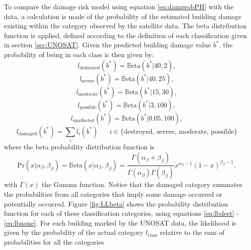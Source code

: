 \documentclass[10pt,a4paper]{article}
\begin{document}
\begin{multicols}{1}
To compare the damage risk model using equation \ref{eq:damprobPH} with the data, a calculation is made of the probability of the estimated building damage existing within the category observed by the satellite data. The beta distribution function is applied, defined according to the definition of each classification given in section \ref{sec:UNOSAT}. Given the predicted building damage value $b^*$, the probability of being in each class is then given by:
\begin{equation}\label{eq:lbdest}
  l_{\text{destroyed}}(b^*)=\mathbb{B}\text{eta}(b^*|40,2),
\end{equation}
\begin{equation}\label{eq:lbmaj}
  l_{\text{severe}}(b^*)=\mathbb{B}\text{eta}(b^*|40,25),
\end{equation}
\begin{equation}\label{eq:lbmin}
  l_{\text{moderate}}(b^*)=\mathbb{B}\text{eta}(b^*|15,30),
\end{equation}
\begin{equation}\label{eq:lbmin}
  l_{\text{possible}}(b^*)=\mathbb{B}\text{eta}(b^*|3,100),
\end{equation}
\begin{equation}\label{eq:lbnone}
  l_{\text{unaffected}}(b^*)=\mathbb{B}\text{eta}(b^*|0.05,100),
\end{equation}
\begin{equation}\label{eq:lbnone}
  l_{\text{damaged}}(b^*)=\sum_i l_i(b^*)\;\;\;\;\;\; i\in \{\text{destroyed, severe, moderate, possible}\}
\end{equation}
where the beta probability distribution function is
\begin{equation}\label{eq:betadist}
  \text{Pr}(x|\alpha_{\beta},\beta_{\beta})=\mathbb{B}\text{eta}(x|\alpha_{\beta},\beta_{\beta})
  =\frac{\Gamma(\alpha_{\beta}+\beta_{\beta})}{\Gamma(\alpha_{\beta})\Gamma(\beta_{\beta})}x^{\alpha_{\beta}-1}(1-x)^{\beta_{\beta}-1},
\end{equation}
with $\Gamma(x)$ the Gamma function. Notice that the damaged category summates the probabilities from all categories that imply some damage occurred or potentially occurred. Figure \ref{fig:LLbeta} shows the probability distribution function for each of these classification categories, using equations \ref{eq:lbdest} - \ref{eq:lbnone}. For each building marked by the UNOSAT data, the likelihood is given by the probability of the actual category $l_{\text{class}}$ relative to the sum of probabilities for all the categories
\begin{equation}\label{eq:LLBD}

\end{equation}
\end{multicols}
\end{document}
